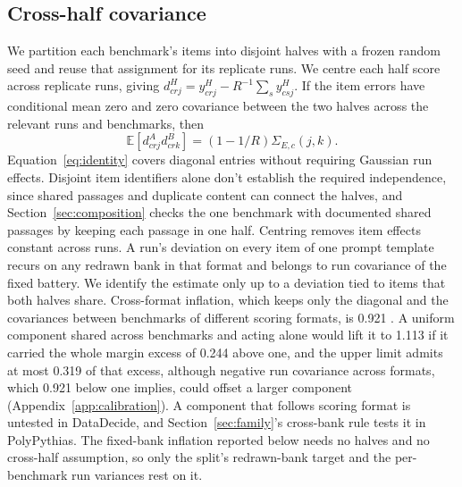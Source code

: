 \subsection{Cross-half covariance}
We partition each benchmark's items into disjoint halves with a frozen random seed and reuse that assignment for its replicate runs. We centre each half score across replicate runs, giving $d^H_{crj}=y^H_{crj}-R^{-1}\sum_s y^H_{csj}$. If the item errors have conditional mean zero and zero covariance between the two halves across the relevant runs and benchmarks, then
\begin{equation}
\mathbb{E}[d^A_{crj}d^B_{crk}]=(1-1/R)\Sigma_{E,c}(j,k).
\label{eq:identity}
\end{equation}
Equation~\ref{eq:identity} covers diagonal entries without requiring Gaussian run effects. Disjoint item identifiers alone don't establish the required independence, since shared passages and duplicate content can connect the halves, and Section~\ref{sec:composition} checks the one benchmark with documented shared passages by keeping each passage in one half. Centring removes item effects constant across runs. A run's deviation on every item of one prompt template recurs on any redrawn bank in that format and belongs to run covariance of the fixed battery. We identify the estimate only up to a deviation tied to items that both halves share. Cross-format inflation, which keeps only the diagonal and the covariances between benchmarks of different scoring formats, is 0.921 . A uniform component shared across benchmarks and acting alone would lift it to 1.113 if it carried the whole margin excess of 0.244 above one, and the upper limit admits at most 0.319 of that excess, although negative run covariance across formats, which 0.921 below one implies, could offset a larger component (Appendix~\ref{app:calibration}). A component that follows scoring format is untested in DataDecide, and Section~\ref{sec:family}'s cross-bank rule tests it in PolyPythias. The fixed-bank inflation reported below needs no halves and no cross-half assumption, so only the split's redrawn-bank target and the per-benchmark run variances rest on it.

